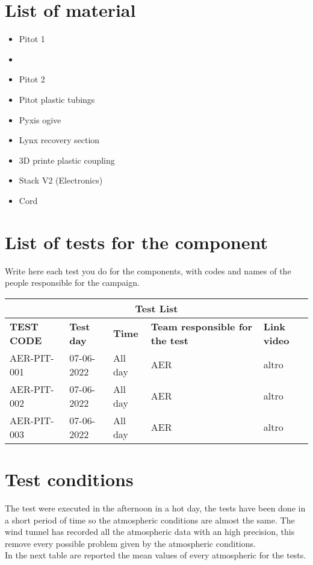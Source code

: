 \section{List of material}

\begin{itemize}
    \item Pitot 1 
    \item 
    \item Pitot 2
    \item Pitot plastic tubings
    \item Pyxis ogive 
    \item Lynx recovery section
    \item 3D printe plastic coupling
    \item Stack V2 (Electronics)
    \item Cord
\end{itemize}

\section{List of tests for the component}
Write here each test you do for the components, with codes and names of the people responsible for the campaign.\\
\begin{table}[ht]
\centering
\begin{tabular}{ |p{2.5cm}||p{2.5cm}|p{2.5cm}|p{2.5cm}|p{2.5cm}| }
 \hline
 \multicolumn{5}{|c|}{Test List} \\
 \hline
 \textbf{TEST CODE} & \textbf{Test day}  &\textbf{Time}  &\textbf{Team responsible for the test} &\textbf{Link video} \\
 \hline
 AER-PIT-001   & 07-06-2022    &All day&   AER&altro\\
 \hline
 AER-PIT-002   & 07-06-2022    &All day&   AER&altro\\
 \hline
 AER-PIT-003   & 07-06-2022    &All day&   AER&altro\\
 \hline
\end{tabular}
\end{table}

\section{Test conditions}

The test were executed in the afternoon in a hot day, the tests have been done in a short period
of time so the atmospheric conditions are almost the same. The wind tunnel has recorded all the
atmospheric data with an high precision, this remove every possible problem given by the atmospheric
conditions.\\
In the next table are reported the mean values of every atmospheric for the tests.\\


